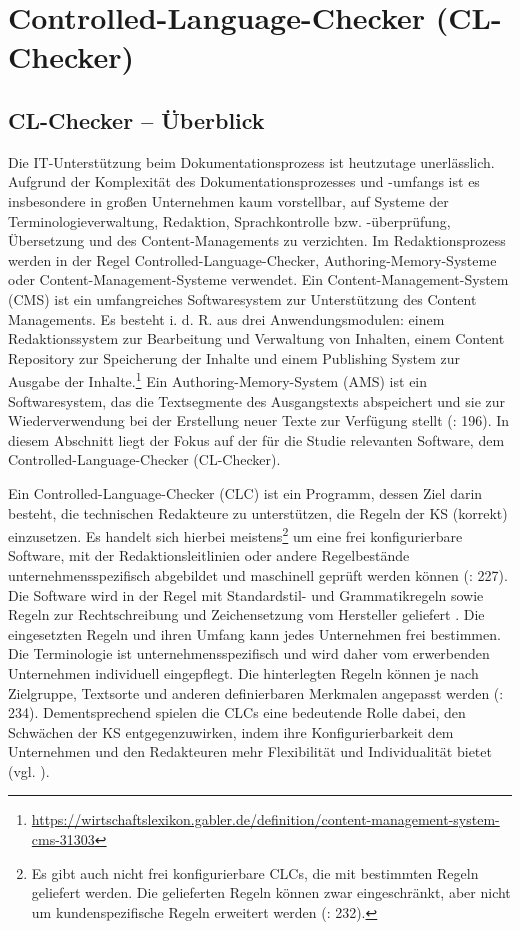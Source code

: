 \section{\label{sec:2.5}Controlled-Language-Checker (CL-Checker)}
\subsection{CL-Checker – Überblick}

Die IT-Unterstützung beim Dokumentationsprozess ist heutzutage unerlässlich. Aufgrund der Komplexität des Dokumentationsprozesses und -umfangs ist es insbesondere in großen Unternehmen kaum vorstellbar, auf Systeme der Terminologieverwaltung, Redaktion, Sprachkontrolle bzw. \nobreakdash-überprüfung, Übersetzung und des Content-Managements zu verzichten. Im Redaktionsprozess werden in der Regel Controlled-Language-Checker, Authoring-Memory-Systeme oder Content-Management-Systeme verwendet. Ein Content-Management-System (CMS) ist ein umfangreiches Softwaresystem zur Unterstützung des Content Managements. Es besteht i. d. R. aus drei Anwendungsmodulen: einem Redaktionssystem zur Bearbeitung und Verwaltung von Inhalten, einem Content Repository zur Speicherung der Inhalte und einem Publishing System zur Ausgabe der Inhalte.\footnote{\url{https://wirtschaftslexikon.gabler.de/definition/content-management-system-cms-31303}} Ein Authoring-Memory-System (AMS) ist ein Softwaresystem, das die Textsegmente des Ausgangstexts abspeichert und sie zur Wiederverwendung bei der Erstellung neuer Texte zur Verfügung stellt (\citealt{DrewerSchmitz2017}: 196). In diesem Abschnitt liegt der Fokus auf der für die Studie relevanten Software, dem Controlled-Language-Checker (CL-Checker).

Ein Controlled-Language-Checker (CLC) ist ein Programm, dessen Ziel darin besteht, die technischen Redakteure zu unterstützen, die Regeln der KS (korrekt) einzusetzen. Es handelt sich hierbei meistens\footnote{{{{Es gibt auch nicht frei konfigurierbare CLCs, die mit bestimmten Regeln geliefert werden. Die gelieferten Regeln können zwar eingeschränkt, aber nicht um kundenspezifische Regeln erweitert werden (\citealt{DrewerZiegler2014}: 232).}}}} um eine frei konfigurierbare Software, mit der Redaktionsleitlinien oder andere Regelbestände unternehmensspezifisch abgebildet und maschinell geprüft werden können (\citealt{DrewerZiegler2014}: 227). Die Software wird in der Regel mit Standardstil- und Grammatikregeln sowie Regeln zur Rechtschreibung und Zeichensetzung vom Hersteller geliefert \citep{Geldbach2009}. Die eingesetzten Regeln und ihren Umfang kann jedes Unternehmen frei bestimmen. Die Terminologie ist unternehmensspezifisch und wird daher vom erwerbenden Unternehmen individuell eingepflegt. Die hinterlegten Regeln können je nach Zielgruppe, Textsorte und anderen definierbaren Merkmalen angepasst werden (\citealt{DrewerZiegler2014}: 234). Dementsprechend spielen die CLCs eine bedeutende Rolle dabei, den Schwächen der KS entgegenzuwirken, indem ihre Konfigurierbarkeit dem Unternehmen und den Redakteuren mehr Flexibilität und Individualität bietet (vgl. \citealt{Rösener2010}).

